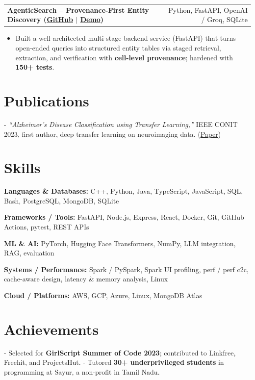 \documentclass[letterpaper,11pt]{article}
\makeatletter
\newcommand{\projItem}[2]{%
  \vspace{6pt}
  \begin{tabular*}{\textwidth}{@{}l@{\extracolsep{\fill}}r@{}}
    \textbf{#1} & #2 \\
  \end{tabular*}\par\vspace{-2pt}
}
\newcommand{\skillLine}[2]{\textbf{#1:} #2\par\vspace{2pt}}
\newcommand{\inlineBlock}[1]{{\setlength{\leftskip}{0.18in}\small #1\par}}
\makeatother
\begin{document}
\projItem{AgenticSearch -- Provenance-First Entity Discovery {\normalfont\small(\href{https://github.com/Deva-1903/ciir_agentic_search}{GitHub} $\vert$ \href{https://agentic-search-negglszkwa-uc.a.run.app}{Demo})}}{Python, FastAPI, OpenAI / Groq, SQLite}
\begin{itemize}
  \item Built a well-architected multi-stage backend service (FastAPI) that turns open-ended queries into structured entity tables via staged retrieval, extraction, and verification with \textbf{cell-level provenance}; hardened with \textbf{150+ tests}.
\end{itemize}

\section{Publications}
\inlineBlock{- \textit{``Alzheimer's Disease Classification using Transfer Learning,''} IEEE CONIT 2023, first author, deep transfer learning on neuroimaging data. {\normalfont\small(\href{https://ieeexplore.ieee.org/document/10205760}{Paper})}}

\section{Skills}
\skillLine{Languages \& Databases}{C++, Python, Java, TypeScript, JavaScript, SQL, Bash, PostgreSQL, MongoDB, SQLite}
\skillLine{Frameworks / Tools}{FastAPI, Node.js, Express, React, Docker, Git, GitHub Actions, pytest, REST APIs}
\skillLine{ML \& AI}{PyTorch, Hugging Face Transformers, NumPy, LLM integration, RAG, evaluation}
\skillLine{Systems / Performance}{Spark / PySpark, Spark UI profiling, perf / perf c2c, cache-aware design, latency \& memory analysis, Linux}
\skillLine{Cloud / Platforms}{AWS, GCP, Azure, Linux, MongoDB Atlas}

\section{Achievements}
\inlineBlock{- Selected for \textbf{GirlScript Summer of Code 2023}; contributed to Linkfree, Freehit, and ProjectsHut. - Tutored \textbf{30+ underprivileged students} in programming at Sayur, a non-profit in Tamil Nadu.}
\end{document}
